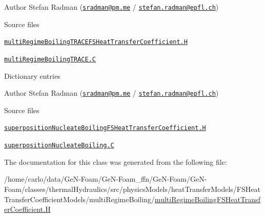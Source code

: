 Author Stefan Radman (\href{mailto:sradman@pm.me}{\tt sradman@pm.\+me} / \href{mailto:stefan.radman@epfl.ch}{\tt stefan.\+radman@epfl.\+ch})

\begin{DoxyParagraph}{Source files}

\begin{DoxyItemize}
\item \href{../../../home/carlo/data/GeN-Foam/GeN-Foam_ffn/GeN-Foam/GeN-Foam/classes/thermalHydraulics/src/physicsModels/heatTransferModels/FSHeatTransferCoefficientModels/multiRegimeBoilingTRACE/multiRegimeBoilingTRACEFSHeatTransferCoefficient.H}{\tt multi\+Regime\+Boiling\+T\+R\+A\+C\+E\+F\+S\+Heat\+Transfer\+Coefficient.\+H} 
\item \href{../../../home/carlo/data/GeN-Foam/GeN-Foam_ffn/GeN-Foam/GeN-Foam/classes/thermalHydraulics/src/physicsModels/heatTransferModels/FSHeatTransferCoefficientModels/multiRegimeBoilingTRACE/multiRegimeBoilingTRACE.C}{\tt multi\+Regime\+Boiling\+T\+R\+A\+C\+E.\+C} 
\end{DoxyItemize}
\end{DoxyParagraph}
\label{_Description}%
 Dictionary entries

Author Stefan Radman (\href{mailto:sradman@pm.me}{\tt sradman@pm.\+me} / \href{mailto:stefan.radman@epfl.ch}{\tt stefan.\+radman@epfl.\+ch})

\begin{DoxyParagraph}{Source files}

\begin{DoxyItemize}
\item \href{../../../home/carlo/data/GeN-Foam/GeN-Foam_ffn/GeN-Foam/GeN-Foam/classes/thermalHydraulics/src/physicsModels/heatTransferModels/FSHeatTransferCoefficientModels/subModels/superpositionNucleateBoiling/superpositionNucleateBoilingFSHeatTransferCoefficient.H}{\tt superposition\+Nucleate\+Boiling\+F\+S\+Heat\+Transfer\+Coefficient.\+H} 
\item \href{../../../home/carlo/data/GeN-Foam/GeN-Foam_ffn/GeN-Foam/GeN-Foam/classes/thermalHydraulics/src/physicsModels/heatTransferModels/FSHeatTransferCoefficientModels/subModels/superpositionNucleateBoiling/superpositionNucleateBoiling.C}{\tt superposition\+Nucleate\+Boiling.\+C} 
\end{DoxyItemize}
\end{DoxyParagraph}


The documentation for this class was generated from the following file\+:\begin{DoxyCompactItemize}
\item 
/home/carlo/data/\+Ge\+N-\/\+Foam/\+Ge\+N-\/\+Foam\+\_\+ffn/\+Ge\+N-\/\+Foam/\+Ge\+N-\/\+Foam/classes/thermal\+Hydraulics/src/physics\+Models/heat\+Transfer\+Models/\+F\+S\+Heat\+Transfer\+Coefficient\+Models/multi\+Regime\+Boiling/\hyperlink{multiRegimeBoilingFSHeatTransferCoefficient_8H}{multi\+Regime\+Boiling\+F\+S\+Heat\+Transfer\+Coefficient.\+H}\end{DoxyCompactItemize}
